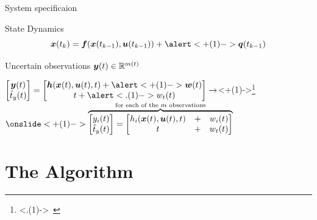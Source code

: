 \documentclass[aspectratio=169]{conf-beamer}
\begin{document}
\begin{frame}{System specificaion}

  \vfill
  \begin{block}{State Dynamics}
    \begin{equation*}
      \vec{x}(t_{k}) = \vec{f}(\vec{x}(t_{k-1}),\vec{u}(t_{k-1})) + \alert<+(1)->{\vec{q}(t_{k-1})}
      \label{eq:setfilter_plant_static}
    \end{equation*}
  \end{block}

  \vfill
  \begin{block}{Uncertain observations}
    $\boldsymbol{y}(t)\in\mathbb{R}^{m(t)}$

    $
    \begin{bmatrix}
      \vec{y}(t) \\ \hat{t}_y(t)
    \end{bmatrix} = \begin{bmatrix}
      \vec{h}(\vec{x}(t), \vec{u}(t), t) + \alert<+(1)->{\vec{w}(t)} \\
      t + \alert<.(1)->{w_t(t)}
    \end{bmatrix}%
    \to$\onslide<+(1)->{\footnote{\onslide<.(1)->{\articlesymbol\ \cite{scott2016constrained}}}}$\onslide<+(1)->{ \overbrace{
        \begin{bmatrix}
          {y}_i(t) \\
          \hat{t}_y(t)
        \end{bmatrix}
        =
        \begin{bmatrix}
          h_i(\vec{x}(t), \vec{u}(t), t) &+& w_{i}(t) \\
          t &+& w_t(t)
        \end{bmatrix}}^{\text{for each of the } m \text{ observations}}}
    $
  \end{block}
  
\end{frame}

\section{The Algorithm}
\end{document}
